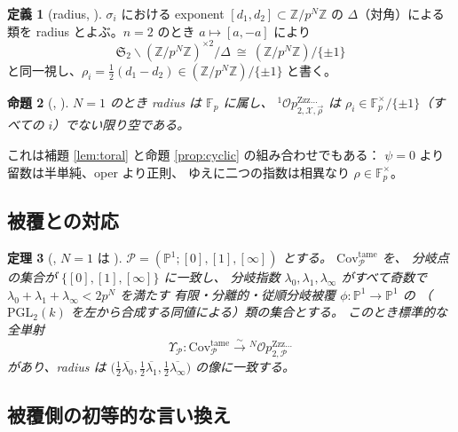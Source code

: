 \documentclass[a4paper,11pt]{ltjsarticle}
\theoremstyle{plain}
\newtheorem{theorem}{定理}[section]
\newtheorem{proposition}[theorem]{命題}
\theoremstyle{definition}
\newtheorem{definition}[theorem]{定義}
\newcommand{\bbP}{\mathbb{P}}
\newcommand{\bbZ}{\mathbb{Z}}
\newcommand{\bbF}{\mathbb{F}}
\newcommand{\sX}{\mathscr{X}}
\newcommand{\sP}{\mathscr{P}}
\newcommand{\fS}{\mathfrak{S}}
\newcommand{\Op}{\mathcal{O}p}
\newcommand{\Zzz}{\mathrm{Zzz\dots}}
\begin{document}
\begin{definition}[radius, {\cite[Def.~4.3.2, Rem.~4.3.1]{Wak}}]
$\sigma_i$ における exponent $[d_1,d_2]\subset\bbZ/p^N\bbZ$ の
$\Delta$（対角）による類を radius とよぶ。$n=2$ のとき
$a\mapsto[a,-a]$ により
\[
  \fS_2\backslash(\bbZ/p^N\bbZ)^{\times2}/\Delta\ \cong\ (\bbZ/p^N\bbZ)/\{\pm1\}
\]
と同一視し、$\rho_i=\tfrac12(d_1-d_2)\in(\bbZ/p^N\bbZ)/\{\pm1\}$ と書く。
\end{definition}

\begin{proposition}[{\cite[Rem.~4.3.3]{Wak}}, {\cite[Chap.~II, Prop.~1.4, 1.5]{Moc}}]
\label{prop:radius-unit}
$N=1$ のとき radius は $\bbF_p$ に属し、
${}^1\Op^{\Zzz}_{2,\sX,\vec\rho}$ は
$\rho_i\in\bbF_p^\times/\{\pm1\}$（すべての $i$）でない限り空である。
\end{proposition}

これは補題 \ref{lem:toral} と命題 \ref{prop:cyclic} の組み合わせでもある：
$\psi=0$ より留数は半単純、oper より正則、
ゆえに二つの指数は相異なり $\rho\in\bbF_p^\times$。

\subsection{被覆との対応}

\begin{theorem}[{\cite[Thm.~C]{Wak}}, $N=1$ は {\cite[Introduction, Thm.~1.3]{Moc}}]
\label{thm:covering}
$\sP=(\bbP^1;[0],[1],[\infty])$ とする。
$\mathrm{Cov}^{\mathrm{tame}}_{\sP}$ を、
分岐点の集合が $\{[0],[1],[\infty]\}$ に一致し、
分岐指数 $\lambda_0,\lambda_1,\lambda_\infty$ がすべて奇数で
$\lambda_0+\lambda_1+\lambda_\infty<2p^N$ を満たす
有限・分離的・従順分岐被覆 $\phi:\bbP^1\to\bbP^1$ の
（$\mathrm{PGL}_2(k)$ を左から合成する同値による）類の集合とする。
このとき標準的な全単射
\[
  \Upsilon_{\sP}:\mathrm{Cov}^{\mathrm{tame}}_{\sP}
  \xrightarrow{\ \sim\ }{}^N\Op^{\Zzz}_{2,\sP}
\]
があり、radius は $\bigl(\tfrac12\overline{\lambda_0},
\tfrac12\overline{\lambda_1},\tfrac12\overline{\lambda_\infty}\bigr)$ の像に一致する。
\end{theorem}

\subsection{被覆側の初等的な言い換え}
\end{document}
